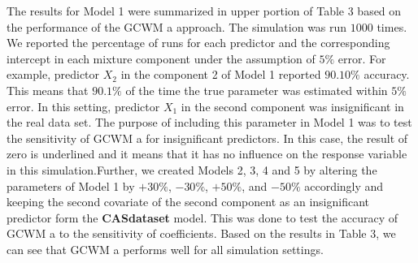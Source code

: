 \documentclass[11pt,letterpaper]{article}
\numberwithin{equation}{section}
\numberwithin{equation}{section}
\numberwithin{equation}{section}
\begin{document}
The results for Model 1 were summarized in upper portion of Table 3 based on the performance of the  GCWM a approach. The simulation was run $1000$ times. We reported the percentage of runs for each predictor and the corresponding intercept in each mixture component under the assumption of $5\%$ error. For example, predictor $X_2$ in the component 2 of Model 1 reported $90.10\%$ accuracy. This means that $90.1\%$ of the time the true parameter was estimated within $5\%$ error. In this setting, predictor $X_1$ in the second component was insignificant in the real data set. The purpose of including this parameter in Model 1 was to test the sensitivity of  GCWM a for insignificant predictors. In this case, the result of zero is underlined and it means that it has no influence on the response variable in this simulation.Further, we created Models 2, 3, 4 and 5 by altering the parameters of Model 1 by $+30\%$, $-30\%$, $+50\%$, and $-50\%$ accordingly and keeping the second covariate of the second component as an insignificant predictor form the \textbf{CASdataset} model. This was done to test the accuracy of  GCWM a to the  sensitivity of coefficients. Based on the results in Table 3, we can see that  GCWM a performs well for all simulation settings.
\end{document}
